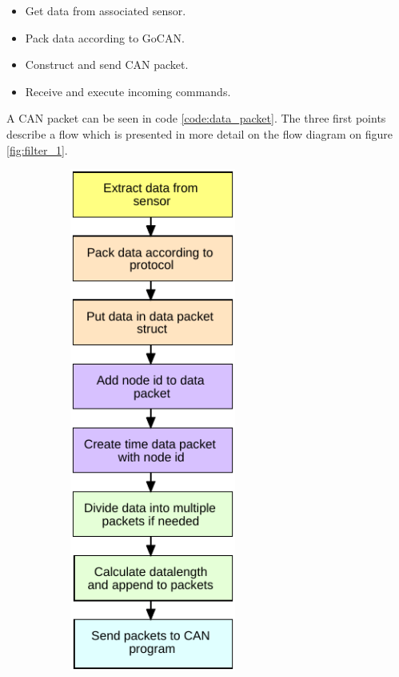 \begin{itemize}
\item Get data from associated sensor.
\item Pack data according to GoCAN.
\item Construct and send CAN packet.
\item Receive and execute incoming commands.
\end{itemize}

A CAN packet can be seen in code \ref{code:data_packet}.
The three first points describe a flow which is presented in more detail on the flow diagram on figure \ref{fig:filter_1}.

\begin{figure}[!h]
\centering
\begin{subfigure}{0.45\textwidth}
\centering
\includegraphics[width=0.60\textwidth]{graphics/FlowChart_Node_Packing}

\end{subfigure}
\end{figure}
